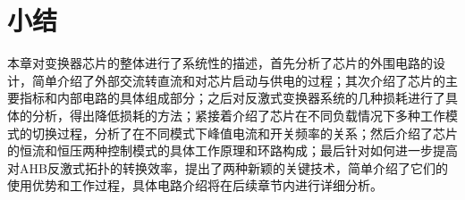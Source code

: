 \section{小结}

本章对变换器芯片的整体进行了系统性的描述，首先分析了芯片的外围电路的设计，简单介绍了外部交流转直流和对芯片启动与供电的过程；其次介绍了芯片的主要指标和内部电路的具体组成部分；之后对反激式变换器系统的几种损耗进行了具体的分析，得出降低损耗的方法；紧接着介绍了芯片在不同负载情况下多种工作模式的切换过程，分析了在不同模式下峰值电流和开关频率的关系；然后介绍了芯片的恒流和恒压两种控制模式的具体工作原理和环路构成；最后针对如何进一步提高对AHB反激式拓扑的转换效率，提出了两种新颖的关键技术，简单介绍了它们的使用优势和工作过程，具体电路介绍将在后续章节内进行详细分析。


